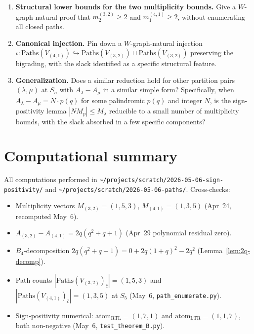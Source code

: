 \documentclass[11pt]{article}
\theoremstyle{definition}
\begin{document}
\begin{enumerate}[leftmargin=2em,topsep=0.3em,itemsep=0.3em]
\item \textbf{Structural lower bounds for the two multiplicity bounds.} Give a $W$-graph-natural proof that $m^{(3,2)}_2 \geq 2$ and $m^{(4,1)}_1 \geq 2$, without enumerating all closed paths.
\item \textbf{Canonical injection.} Pin down a $W$-graph-natural injection $\iota: \mathrm{Paths}(V_{(4,1)}) \hookrightarrow \mathrm{Paths}(V_{(3,2)}) \sqcup \mathrm{Paths}(V_{(3,2)})$ preserving the bigrading, with the slack identified as a specific structural feature.
\item \textbf{Generalization.} Does a similar reduction hold for other partition pairs $(\lambda, \mu)$ at $S_n$ with $A_\lambda - A_\mu$ in a similar simple form? Specifically, when $A_\lambda - A_\mu = N \cdot p(q)$ for some palindromic $p(q)$ and integer $N$, is the sign-positivity lemma $|N M_p| \leq M_\lambda$ reducible to a small number of multiplicity bounds, with the slack absorbed in a few specific components?
\end{enumerate}

\section*{Computational summary}

All computations performed in \texttt{\textasciitilde/projects/scratch/2026-05-06-sign-positivity/} and \texttt{\textasciitilde/projects/scratch/2026-05-06-paths/}. Cross-checks:
\begin{itemize}[leftmargin=2em,topsep=0.2em,itemsep=0.1em]
\item Multiplicity vectors $M_{(3,2)} = (1,5,3)$, $M_{(4,1)} = (1,3,5)$ (Apr~24, recomputed May~6).
\item $A_{(3,2)} - A_{(4,1)} = 2q(q^2+q+1)$ (Apr~29 polynomial residual zero).
\item $B_4$-decomposition $2q(q^2+q+1) = 0 + 2 q(1+q)^2 - 2 q^2$ (Lemma~\ref{lem:2q-decomp}).
\item Path counts $|\mathrm{Paths}(V_{(3,2)})_{\bar c}| = (1, 5, 3)$ and $|\mathrm{Paths}(V_{(4,1)})_{\bar c}| = (1, 3, 5)$ at $S_5$ (May~6, \texttt{path\_enumerate.py}).
\item Sign-positivity numerical: $\mathrm{atom}_{\mathrm{RTL}} = (1, 7, 1)$ and $\mathrm{atom}_{\mathrm{LTR}} = (1, 1, 7)$, both non-negative (May~6, \texttt{test\_theorem\_B.py}).
\end{itemize}
\end{document}
